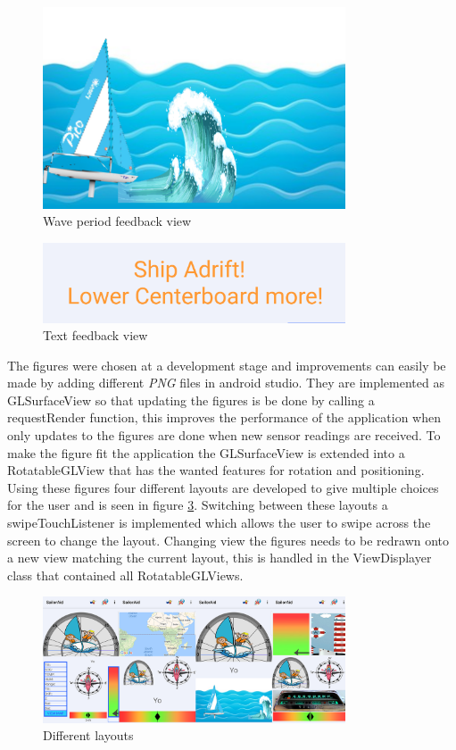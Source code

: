 \begin{figure}[H]
\centering
\includegraphics[width=0.8\textwidth]{Figures/wave.png}
\caption{Wave period feedback view}
\label{feedback-wave}
\end{figure}
\begin{figure}[H]
\centering
\includegraphics[width=0.8\textwidth]{Figures/text.png}
\caption{Text feedback view}
\label{feedback-text}
\end{figure}
The figures were chosen at a development stage and improvements can easily be made by adding different \textit{PNG}\cite{png} files in android studio. They are implemented as GLSurfaceView\cite{gl} so that updating the figures is be done by calling a requestRender function, this improves the performance of the application when only updates to the figures are done when new sensor readings are received. To make the figure fit the application the GLSurfaceView is extended into a RotatableGLView that has the wanted features for rotation and positioning. Using these figures four different layouts are developed to give multiple choices for the user and is seen in figure \ref{feedback-layouts}. Switching between these layouts a swipeTouchListener is implemented which allows the user to swipe across the screen to change the layout. Changing view the figures needs to be redrawn onto a new view matching the current layout, this is handled in the ViewDisplayer class that contained all RotatableGLViews.

\begin{figure}[H]
\centering
\includegraphics[width=0.8\textwidth]{Figures/layouts.png}
\caption{Different layouts}
\label{feedback-layouts}
\end{figure}

